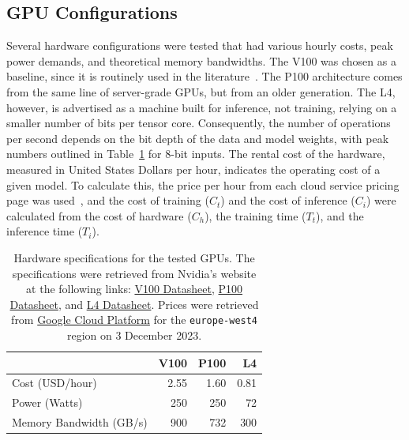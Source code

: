 \documentclass[conference]{IEEEtran}%
\begin{document}
\subsection{GPU Configurations}

Several hardware configurations were tested that had various hourly costs, peak power demands, and theoretical memory bandwidths. 
The V100 was chosen as a baseline, since it is routinely used in the literature~\cite{svedin2021benchmarking,xu2018deep}. 
The P100 architecture comes from the same line of server-grade GPUs, but from an older generation. 
The L4, however, is advertised as a machine built for inference, not training, relying on a smaller number of bits per tensor core. Consequently, the number of operations per second depends on the bit depth of the data and model weights, with peak numbers outlined in Table~\ref{tab:hardware} for 8-bit inputs. 
The rental cost of the hardware, measured in United States Dollars per hour, indicates the operating cost of a given model. 
To calculate this, the price per hour from each cloud service pricing page was used~\cite{pricing_1,pricing_2}, and the cost of training ($C_{t}$) and the cost of inference ($C_{i}$) were calculated from the cost of hardware ($C_{h}$), the training time ($T_{t}$), and the inference time ($T_{i}$).
\begin{table}[h]
    \centering
    \begin{tabular}{lrrr}
    \toprule
                            & V100   & P100   & L4    \\
    \midrule
    Cost (USD/hour)         & 2.55   & 1.60   & 0.81  \\
    Power (Watts)           & 250    & 250    & 72    \\
    Memory Bandwidth (GB/s) & 900    & 732    & 300   \\
    \end{tabular}
    \caption{Hardware specifications for the tested GPUs. The specifications were retrieved from Nvidia's website at the following links:
    \href{https://images.nvidia.com/content/technologies/volta/pdf/volta-v100-datasheet-update-us-1165301-r5.pdf}{V100 Datasheet},
    \href{https://images.nvidia.com/content/tesla/pdf/nvidia-tesla-p100-PCIe-datasheet.pdf}{P100 Datasheet}, and
    \href{https://nvdam.widen.net/s/rvq98gbwsw/l4-datasheet-2595652}{L4 Datasheet}. Prices were retrieved from \href{https://cloud.google.com/pricing/list}{Google Cloud Platform} for the \texttt{europe-west4} region on 3 December 2023.
    }
    \label{tab:hardware}
\end{table}
\end{document}
